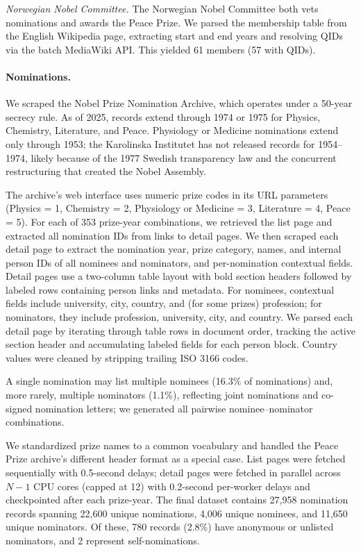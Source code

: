\documentclass[12pt]{article}
\begin{document}
\emph{Norwegian Nobel Committee.} The Norwegian Nobel Committee both vets nominations and awards the Peace Prize. We parsed the membership table from the English Wikipedia page, extracting start and end years and resolving QIDs via the batch MediaWiki API. This yielded 61 members (57 with QIDs).

\paragraph*{Nominations.}

We scraped the Nobel Prize Nomination Archive, which operates under a 50-year secrecy rule. As of 2025, records extend through 1974 or 1975 for Physics, Chemistry, Literature, and Peace. Physiology or Medicine nominations extend only through 1953; the Karolinska Institutet has not released records for 1954--1974, likely because of the 1977 Swedish transparency law and the concurrent restructuring that created the Nobel Assembly.

The archive's web interface uses numeric prize codes in its URL parameters (Physics = 1, Chemistry = 2, Physiology or Medicine = 3, Literature = 4, Peace = 5). For each of 353 prize-year combinations, we retrieved the list page and extracted all nomination IDs from links to detail pages. We then scraped each detail page to extract the nomination year, prize category, names, and internal person IDs of all nominees and nominators, and per-nomination contextual fields. Detail pages use a two-column table layout with bold section headers followed by labeled rows containing person links and metadata. For nominees, contextual fields include university, city, country, and (for some prizes) profession; for nominators, they include profession, university, city, and country. We parsed each detail page by iterating through table rows in document order, tracking the active section header and accumulating labeled fields for each person block. Country values were cleaned by stripping trailing ISO 3166 codes.

A single nomination may list multiple nominees (16.3\% of nominations) and, more rarely, multiple nominators (1.1\%), reflecting joint nominations and co-signed nomination letters; we generated all pairwise nominee--nominator combinations.

We standardized prize names to a common vocabulary and handled the Peace Prize archive's different header format as a special case. List pages were fetched sequentially with 0.5-second delays; detail pages were fetched in parallel across $N-1$ CPU cores (capped at 12) with 0.2-second per-worker delays and checkpointed after each prize-year. The final dataset contains 27,958 nomination records spanning 22,600 unique nominations, 4,006 unique nominees, and 11,650 unique nominators. Of these, 780 records (2.8\%) have anonymous or unlisted nominators, and 2 represent self-nominations.
\end{document}
